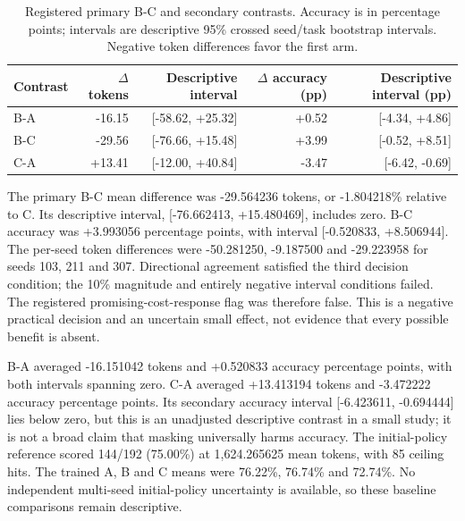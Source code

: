 \documentclass[11pt]{article}
\begin{document}
\begin{table}[htbp]
\centering\small
\begin{tabular}{@{}lrrrr@{}}
\toprule
Contrast & $\Delta$ tokens & Descriptive interval & $\Delta$ accuracy (pp) & Descriptive interval (pp) \\
\midrule
B-A & -16.15 & [-58.62, +25.32] & +0.52 & [-4.34, +4.86] \\
B-C & -29.56 & [-76.66, +15.48] & +3.99 & [-0.52, +8.51] \\
C-A & +13.41 & [-12.00, +40.84] & -3.47 & [-6.42, -0.69] \\
\bottomrule
\end{tabular}
\caption{Registered primary B-C and secondary contrasts. Accuracy is in percentage points; intervals are descriptive 95\% crossed seed/task bootstrap intervals. Negative token differences favor the first arm.}
\label{tab:mechanism-contrasts}
\end{table}

The primary B-C mean difference was -29.564236 tokens, or -1.804218\% relative to C. Its descriptive interval, [-76.662413, +15.480469], includes zero. B-C accuracy was +3.993056 percentage points, with interval [-0.520833, +8.506944]. The per-seed token differences were -50.281250, -9.187500 and -29.223958 for seeds 103, 211 and 307. Directional agreement satisfied the third decision condition; the 10\% magnitude and entirely negative interval conditions failed. The registered promising-cost-response flag was therefore false. This is a negative practical decision and an uncertain small effect, not evidence that every possible benefit is absent.

B-A averaged -16.151042 tokens and +0.520833 accuracy percentage points, with both intervals spanning zero. C-A averaged +13.413194 tokens and -3.472222 accuracy percentage points. Its secondary accuracy interval [-6.423611, -0.694444] lies below zero, but this is an unadjusted descriptive contrast in a small study; it is not a broad claim that masking universally harms accuracy. The initial-policy reference scored 144/192 (75.00\%) at 1,624.265625 mean tokens, with 85 ceiling hits. The trained A, B and C means were 76.22\%, 76.74\% and 72.74\%. No independent multi-seed initial-policy uncertainty is available, so these baseline comparisons remain descriptive.
\end{document}
